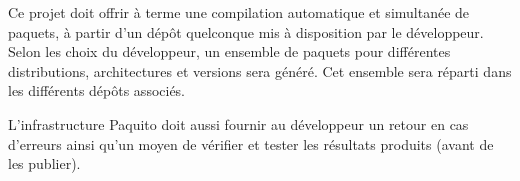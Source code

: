 \documentclass[12pt,a4paper]{article}
\begin{document}
Ce projet doit offrir à terme une compilation automatique et simultanée de paquets, à partir d'un dépôt quelconque mis à disposition par le développeur. Selon les choix du développeur, un ensemble de paquets pour différentes distributions, architectures et versions sera généré. Cet ensemble sera réparti dans les différents dépôts associés.
  
L'infrastructure Paquito doit aussi fournir au développeur un retour en cas d'erreurs ainsi qu'un moyen de vérifier et tester les résultats produits (avant de les publier).
\FloatBarrier

\begin{figure}[!h]
\end{figure}
\end{document}
